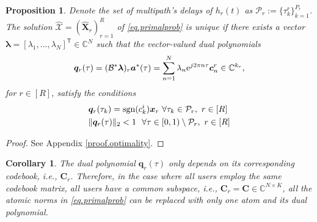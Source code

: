 \documentclass[conference,10pt]{IEEEtran}
\theoremstyle{remark}
\theoremstyle{plain}
\newtheorem{prop}{\textbf{Proposition}}
\newtheorem*{corl}{\textbf{Corollary}}
\theoremstyle{definition}
\theoremstyle{remark}
\begin{document}
\begin{prop}\label{prop.optimality}
Denote the set of multipath's delays of $h_r(t)$ as $\mathcal{P}_r:=\{\tau_k^r\}_{k=1}^{P_r}$. The solution $\widehat{\bm{\mathcal{X}}}=(\widehat{\bm{X}}_r)_{r=1}^R$ of \eqref{eq.primalprob} is unique if there exists a vector $\bm{\lambda}=[\lambda_{1}, \ldots, \lambda_{N}]^{\mathsf{T}}\in\mathbb{C}^N$ such that the vector-valued dual polynomials 
\begin{align}\label{eq.Qi}
\bm{q}_r(\tau)=(\mathcal{B}^*\bm{\lambda})_r\bm{a}^*(\tau)= \sum_{n=1}^{N}\lambda_n {\rm e}^{j2\pi n \tau} \bm{c}_n^r\in\mathbb{C}^{k_r}, 
\end{align}
for $r \in [R]$, satisfy the conditions
\begin{align}
&\bm{q}_r(\tau_k)={\rm sgn}({c_k^{i}})\bm{x}_r~\forall \tau_k\in \mathcal{P}_r,~ r\in [R]\label{eq.supp_cond}\\
&\|\bm{q}_r(\tau)\|_2<1~~\forall \tau \in [0,1)\setminus \mathcal{P}_r,~ r\in [R]\label{eq.offsupp_cond}
\end{align}
 \end{prop}
\begin{proof}
See Appendix \ref{proof.optimality}.
\end{proof}




\begin{corl}
The dual polynomial $\bm{q}_r(\tau)$ only depends on its corresponding codebook, i.e.,   $\bm{C}_r$. Therefore, in the case where all users employ the same codebook matrix, all users have a common subspace, i.e., $\bm{C}_r = \bm{C} \in \mathbb{C}^{N\times K}$,  all the atomic norms in \eqref{eq.primalprob} can be replaced with only one atom and its dual polynomial. 
\end{corl}            


\end{document}
